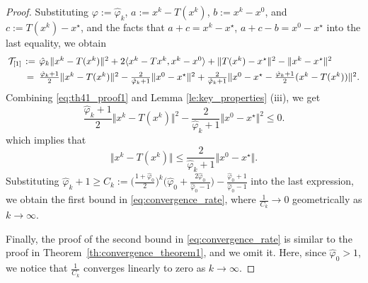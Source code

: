 \documentclass{article}
\theoremstyle{plain}
\theoremstyle{definition}
\newcommand{\norms}[1]{\Vert#1\Vert}
\newcommand{\Tc}{\mathcal{T}}
\newcommand{\iprods}[1]{\langle #1\rangle}
\newcommand{\0}{\boldsymbol{0}}
\begin{document}
\begin{proof}
Substituting $\varphi := \hat{\varphi}_k$, $a:= x^k - T(x^k)$, $b:= x^k - x^0$, and $c:=T(x^k) - x^{\star}$, and the facts that $a + c = x^k-x^{\star}$, $a + c - b=x^0-x^{\star}$ into the last equality, we obtain
\begin{equation}\label{eq:th41_proof1}
\arraycolsep=0.2em
\begin{array}{lcl}
\Tc_{[1]} & := & \hat{\varphi}_k \norms{ x^k - T(x^k) }^2 + 2\iprods{x^k - Tx^k, x^k - x^0 } + \norms{T(x^k) - x^{\star}}^2 - \norms{x^k - x^{\star} }^2 \vspace{1ex} \\
& = & \frac{\hat{\varphi}_k+1}{2}\norms{ x^k - T(x^k) }^2 - \frac{2}{\hat{\varphi}_k+1}\norms{x^0 - x^{\star} }^2 + \frac{2}{ \hat{\varphi}_k+1}\norms{x^0 - x^{\star} - \frac{\hat{\varphi}_k+1}{2}(x^k - T(x^k) )}^2.
\end{array}
\end{equation}
Combining \eqref{eq:th41_proof1} and  Lemma \ref{le:key_properties} (iii), we get
\begin{equation*}
\frac{\hat{\varphi}_k+1}{2}\norms{x^k - T(x^k)}^2 - \frac{2}{\hat{\varphi}_k+1}\norms{ x^0 - x^{\star} }^2 \leq 0.
\end{equation*}
which implies that
\begin{equation*}
\norms{ x^k - T(x^k)}  \leq \frac{2}{\hat{\varphi}_k+1}\norms{ x^0-x^{\star}}.
\end{equation*}
Substituting $\hat{\varphi}_k + 1 \geq C_k := \big( \frac{1 + \hat{\varphi}_0}{2} \big)^k\big(\hat{\varphi}_0 + \frac{2\hat{\varphi}_0}{\hat{\varphi}_0-1}\big) - \frac{\hat{\varphi}_0 + 1}{\hat{\varphi}_0 - 1}$ into the last expression, we obtain the first bound in \eqref{eq:convergence_rate}, where $\frac{1}{C_k} \to 0$ geometrically as $k \to \infty$.

Finally, the proof of the second bound in \eqref{eq:convergence_rate} is similar to the proof in Theorem~\ref{th:convergence_theorem1}, and we omit it.
Here, since $\hat{\varphi}_0 > 1$, we notice that $\frac{1}{C_k}$ converges linearly to zero as $k \to \infty$.
\end{proof}


\end{document}
